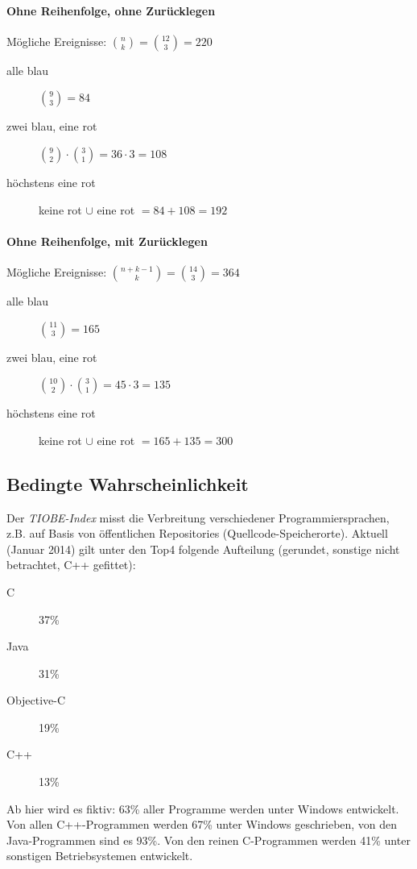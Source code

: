 \documentclass[11pt, a4paper]{article}
\begin{document}
	\paragraph{Ohne Reihenfolge, ohne Zurücklegen}
	Mögliche Ereignisse: $\binom{n}{k} = \binom{12}{3} = 220$
	\begin{description}
		\item[alle blau] $\binom{9}{3} = 84$
		\item[zwei blau, eine rot] $\binom{9}{2} \cdot \binom{3}{1} = 36 \cdot 3 = 108$
		\item[höchstens eine rot] keine rot $\cup$ eine rot $= 84 + 108 = 192$
	\end{description}

	\paragraph{Ohne Reihenfolge, mit Zurücklegen}
	Mögliche Ereignisse: $\binom{n+k-1}{k} = \binom{14}{3} = 364$
	\begin{description}
		\item[alle blau] $\binom{11}{3} = 165$
		\item[zwei blau, eine rot] $\binom{10}{2} \cdot \binom{3}{1} = 45 \cdot 3 = 135$
		\item[höchstens eine rot] keine rot $\cup$ eine rot $= 165 + 135 = 300$
	\end{description}
\fi

\subsection{Bedingte Wahrscheinlichkeit}
Der \textit{TIOBE-Index} misst die Verbreitung verschiedener Programmiersprachen, z.B. auf Basis von öffentlichen Repositories (Quellcode-Speicherorte). Aktuell (Januar 2014) gilt unter den Top4 folgende Aufteilung (gerundet, sonstige nicht betrachtet, C++ gefittet):
\begin{description}
	\item[C] 37\%
	\item[Java] 31\%
	\item[Objective-C] 19\%
	\item[C++] 13\%
\end{description}
Ab hier wird es fiktiv: 63\% aller Programme werden unter Windows entwickelt. Von allen C++-Programmen werden 67\% unter Windows geschrieben, von den Java-Programmen sind es 93\%. Von den reinen C-Programmen werden 41\% unter sonstigen Betriebsystemen entwickelt.
\end{document}
